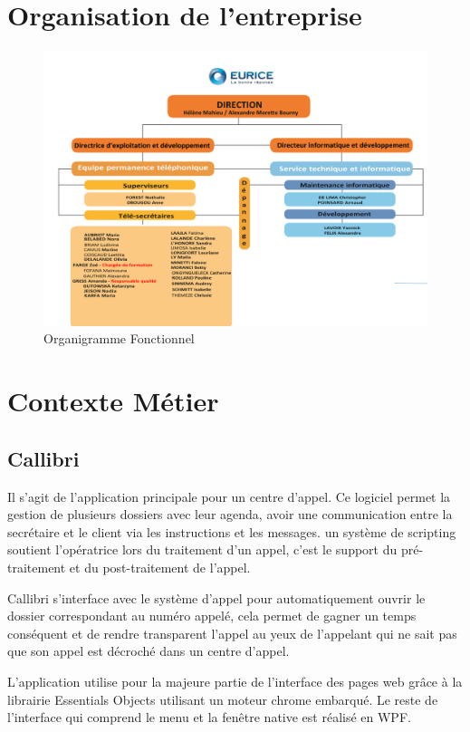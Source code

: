 \section{Organisation de l'entreprise}
\begin{figure}[h]
	\centering
	\includegraphics[width=0.8\linewidth]{Images/organigramme_fonctionnel}
	\caption{Organigramme Fonctionnel}
	\label{fig:organigrammefonctionnel}
\end{figure}

\section{Contexte Métier}

\subsection{Callibri}
Il s'agit de l'application principale pour un centre d'appel. 
Ce logiciel permet la gestion de plusieurs dossiers avec leur agenda, 
avoir une communication entre la secrétaire et le client via les instructions et les messages. 
un système de scripting soutient l'opératrice lors du traitement d'un appel, 
c'est le support du pré-traitement et du post-traitement de l'appel. \newline

\gls{Callibri} s'interface avec le système d'appel pour automatiquement ouvrir le dossier correspondant 
au numéro appelé, cela permet de gagner un temps conséquent 
et de rendre transparent l'appel au yeux de l'appelant qui ne sait pas 
que son appel est décroché dans un centre d'appel. \newline


L'application utilise pour la majeure partie de l'interface des pages web grâce 
à la librairie Essentials Objects utilisant un moteur chrome embarqué.
Le reste de l'interface qui comprend le menu et la fenêtre native est réalisé en WPF. \newline


